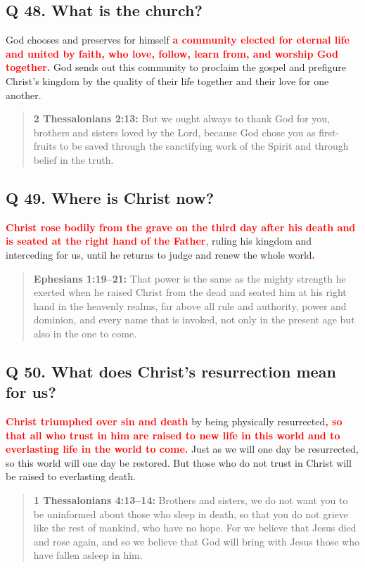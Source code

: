 \documentclass[titlepage]{memoir}
\newcommand\Children[1]{\textbf{\textcolor{red}{#1}}}
\newcommand\Quote[2]{\begin{quote}{\small\textbf{#1:}{ #2}}\end{quote}}
\begin{document}
\subsection{Q 48. What is the church?}
God chooses and preserves for himself \Children{a community elected for eternal life and united by faith, who love, follow, learn from, and worship God together.} God sends out this community to proclaim the gospel and prefigure Christ's kingdom by the quality of their life together and their love for one another.

\Quote{2 Thessalonians 2:13}{But we ought always to thank God for you, brothers and sisters loved by the Lord, because God chose you as first-fruits to be saved through the sanctifying work of the Spirit and through belief in the truth.}

\subsection{Q 49. Where is Christ now?}
\Children{Christ rose bodily from the grave on the third day after his death and is seated at the right hand of the Father}, ruling his kingdom and interceding for us, until he returns to judge and renew the whole world\Children{.}

\Quote{Ephesians 1:19--21}{That power is the same as the mighty strength he exerted when he raised Christ from the dead and seated him at his right hand in the heavenly realms, far above all rule and authority, power and dominion, and every name that is invoked, not only in the present age but also in the one to come.}

\subsection{Q 50. What does Christ's resurrection mean for us?}
\Children{Christ triumphed over sin and death} by being physically resurrected\Children{, so that all who trust in him are raised to new life in this world and to everlasting life in the world to come.} Just as we will one day be resurrected, so this world will one day be restored. But those who do not trust in Christ will be raised to everlasting death.

\Quote{1 Thessalonians 4:13--14}{Brothers and sisters, we do not want you to be uninformed about those who sleep in death, so that you do not grieve like the rest of mankind, who have no hope. For we believe that Jesus died and rose again, and so we believe that God will bring with Jesus those who have fallen asleep in him.}
\end{document}
